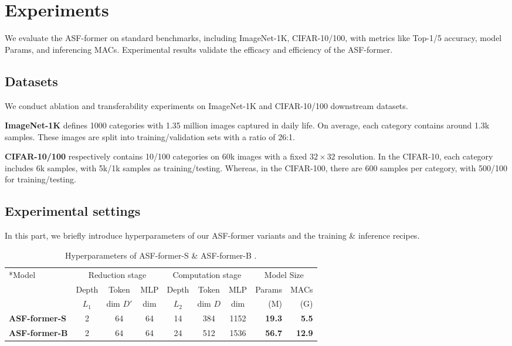 \documentclass[lettersize,journal]{IEEEtran}
\begin{document}
\section{Experiments}
We evaluate the ASF-former on standard benchmarks, including ImageNet-1K, CIFAR-10/100, with metrics like Top-1/5 accuracy, model Params, and inferencing MACs. Experimental results validate the efficacy and efficiency of the ASF-former.
\subsection{Datasets}
We conduct ablation and transferability experiments on ImageNet-1K and CIFAR-10/100 downstream datasets.

\textbf{ImageNet-1K} \cite{imagenet_cvpr09} defines 1000 categories with 1.35 million images captured in daily life. On average, each category contains around 1.3k samples. These images are split into training/validation sets with a ratio of 26:1.

\textbf{CIFAR-10/100} \cite{krizhevsky2009learning} respectively contains 10/100 categories on 60k images with a fixed $32\times32$ resolution. In the CIFAR-10, each category includes 6k samples, with 5k/1k samples as training/testing. Whereas, in the CIFAR-100, there are 600 samples per category, with 500/100 for training/testing.

\subsection{Experimental settings}
In this part, we briefly introduce hyperparameters of our ASF-former variants and the training \& inference recipes.

\setlength{\tabcolsep}{8pt}
\begin{table*}
\begin{center}
\caption{Hyperparameters of ASF-former-S \& ASF-former-B .}
\label{table:variant}
\begin{tabular}{l|ccc|ccc|rr}
\hline\noalign{\smallskip}
\multirow{3}*{Model} &\multicolumn{3}{c}{Reduction stage} &\multicolumn{3}{c}{Computation stage} &\multicolumn{2}{c}{Model Size}\\
 \cline{2-9}
 &Depth &Token &MLP &Depth &Token &MLP &Params &MACs\\
 &$L_1$ &dim $D'$ &dim &$L_2$ &dim $D$ &dim &(M) &(G)\\
\noalign{\smallskip}
\hline
\noalign{\smallskip}
\textbf{ASF-former-S} &2 &64 &64 &14 &384 &1152 &\textbf{19.3} &\textbf{5.5}\\
\textbf{ASF-former-B} &2 &64 &64 &24 &512 &1536 &\textbf{56.7} &\textbf{12.9}\\
\hline
\end{tabular}
\end{center}
\end{table*}
\setlength{\tabcolsep}{1.4pt}
\end{document}
